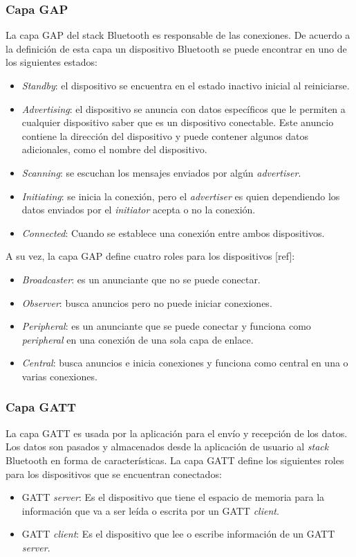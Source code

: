 \subsubsection{Capa GAP}
La capa GAP del stack Bluetooth es responsable de las conexiones. De acuerdo a la definición de esta capa un dispositivo Bluetooth se puede encontrar en uno de los siguientes estados:

\begin{itemize}
\item \textit{Standby}: el dispositivo se encuentra en el estado inactivo inicial al reiniciarse.
\item \textit{Advertising}: el dispositivo se anuncia con datos específicos que le permiten a cualquier dispositivo saber que es un dispositivo conectable. Este anuncio contiene la dirección del dispositivo y puede contener algunos datos adicionales, como el nombre del dispositivo.
\item \textit{Scanning}: se escuchan los mensajes enviados por algún \textit{advertiser}.
\item \textit{Initiating}: se inicia la conexión, pero el \textit{advertiser} es quien dependiendo los datos enviados por el \textit{initiator} acepta o no la conexión.
\item \textit{Connected}: Cuando se establece una conexión entre ambos dispositivos.
\end{itemize}

A su vez, la capa GAP define cuatro roles para los dispositivos [ref]:

\begin{itemize}
\item \textit{Broadcaster}: es un anunciante que no se puede conectar.
\item \textit{Observer}: busca anuncios pero no puede iniciar conexiones.
\item \textit{Peripheral}: es un anunciante que se puede conectar y funciona como \textit{peripheral} en una conexión de una sola capa de enlace.
\item \textit{Central}: busca anuncios e inicia conexiones y funciona como central en una o varias conexiones.
\end{itemize}

\subsubsection{Capa GATT}
La capa GATT es usada por la aplicación para el envío y recepción de los datos. Los datos son pasados y almacenados desde la aplicación de usuario al \textit{stack} Bluetooth en forma de características. La capa GATT define los siguientes roles para los dispositivos que se encuentran conectados:
\begin{itemize}
\item GATT \textit{server}: Es el dispositivo que tiene el espacio de memoria para la información que va a ser leída o escrita por un GATT \textit{client}.
\item GATT \textit{client}: Es el dispositivo que lee o escribe información de un GATT \textit{server}.
\end{itemize}


